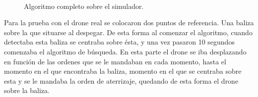 \begin{figure}[H]
 \centering
	\\
 \caption{Algoritmo completo sobre el simulador. }
 \label{f:Algoritmo completo sobre el simulador. }
\end{figure}


\hspace{1cm} Para la prueba con el drone real se colocaron dos puntos de referencia. Una baliza sobre la que situarse al despegar. De esta forma al comenzar el algoritmo, cuando detectaba esta baliza se centraba sobre \'esta, y una vez pasaron 10 segundos comenzaba el algoritmo de b\'usqueda. En esta parte el drone se iba desplazando en funci\'on de las ordenes que se le mandaban en cada momento, hasta el momento en el que encontraba la baliza, momento en el que se centraba sobre esta y se le mandaba la orden de aterrizaje, quedando de esta forma el drone sobre la baliza. 
